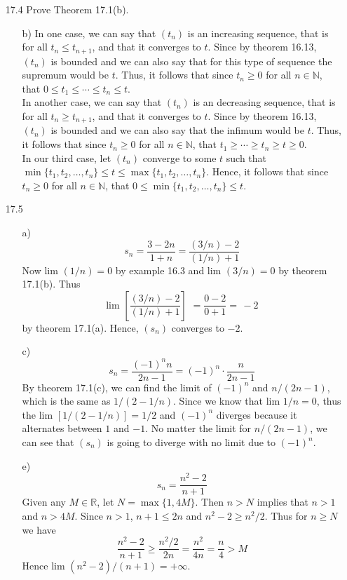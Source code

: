 \documentclass[12pt]{article}
\begin{document}
\begin{enumerate}
\item[17.4] Prove Theorem 17.1(b).
\begin{enumerate}
\item[b)] In one case, we can say that $(t_n)$ is an increasing sequence, that is for all
$t_n \leq t_{n+1}$, and that it converges to $t$. Since by theorem 16.13, $(t_n)$ is bounded
and we can also say that for this type of sequence the supremum would be $t$. 
Thus, it follows that since $t_n \geq 0$
for all $n \in \mathbb{N}$, that $0 \leq t_1 \leq \cdots \leq t_n \leq t$. \\
In another case, we can say that $(t_n)$ is an decreasing sequence, that is for all
$t_n \geq t_{n+1}$, and that it converges to $t$. Since by theorem 16.13, $(t_n)$ is bounded
and we can also say that the infimum would be $t$. Thus, it follows that since $t_n \geq 0$
for all $n \in \mathbb{N}$, that $t_1 \geq \cdots \geq t_n \geq t \geq 0$. \\
In our third case, let $(t_n)$ converge to some $t$ such that \\
$\min\{t_1, t_2, \ldots, t_n\} \leq t \leq \max\{t_1, t_2, \ldots, t_n\}$. Hence,
it follows that since $t_n \geq 0$ for all $n \in \mathbb{N}$, that 
$0 \leq \min\{t_1, t_2, \ldots, t_n\} \leq t$.
\end{enumerate}

\item[17.5] 
\begin{enumerate}
\item[a)] 
\[
s_n = \frac{3 - 2n}{1 + n} = \frac{(3/n) - 2}{(1/n) + 1}
\]
Now lim $(1/n) = 0$ by example 16.3 and lim $(3/n) = 0$ by theorem 17.1(b). Thus
\[
\mbox{lim } \left[ \frac{(3/n) - 2}{(1/n) + 1} \right]
\,\, = \frac{0 - 2}{0 + 1} = \,-2
\]
by theorem 17.1(a). Hence, $(s_n)$ converges to $-2$.

\item[c)] 
\[ 
s_n = \frac{(-1)^nn}{2n - 1} = (-1)^n \cdot \frac{n}{2n - 1}
\]
By theorem 17.1(c), we can find the limit of $(-1)^n$ and $n/(2n - 1)$, which is the same as 
$1/(2 - 1/n)$. Since we know that lim $1/n = 0$, thus the lim $[1/(2 - 1/n)] = 1/2$ and
$(-1)^n$ diverges because it alternates between $1$ and $-1$. No matter the
limit for $n/(2n - 1)$, we can see that $(s_n)$ is going to diverge with no limit due to
$(-1)^n$.

\item[e)] 
\[
s_n = \frac{n^2 - 2}{n + 1}
\]
Given any $M \in \mathbb{R}$, let $N = \max\{1, 4M\}$. Then $n > N$ implies that
$n > 1$ and $n > 4M$. Since $n > 1$, $n + 1 \leq 2n$ and $n^2 - 2 \geq n^2/2$.
Thus for $n \geq N$ we have
\[
\frac{n^2 - 2}{n + 1} \geq \frac{n^2/2}{2n} = \frac{n^2}{4n} = \frac{n}{4} > M
\]
Hence lim $(n^2 - 2)/(n + 1) = +\infty$.


\end{enumerate}
\end{enumerate}
\end{document}
